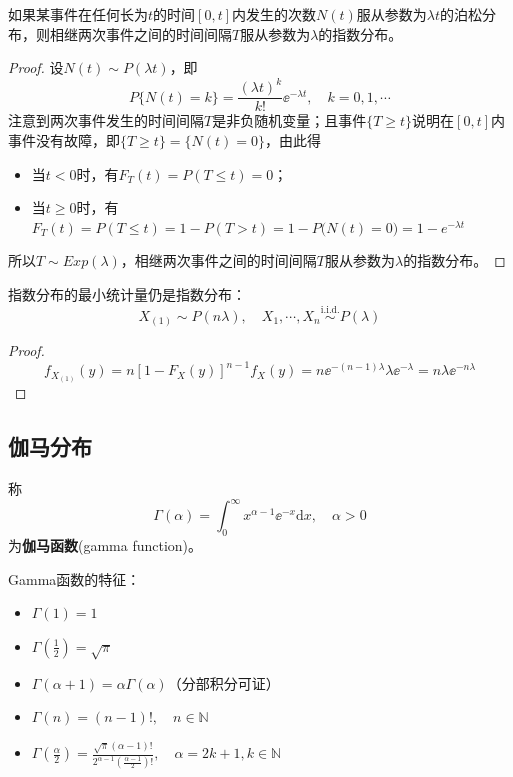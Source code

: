 \begin{proposition}
    如果某事件在任何长为$t$的时间$[0,t]$内发生的次数$N(t)$服从参数为$\lambda t$的泊松分布，则相继两次事件之间的时间间隔$T$服从参数为$\lambda$的指数分布。
\end{proposition}
\begin{proof}
    设$N(t)\sim P(\lambda t)$，即
    \[ P\{ N(t) = k \} = \frac{(\lambda t)^k}{k!} \ee^{-\lambda t},\quad k=0,1,\cdots \]
    注意到两次事件发生的时间间隔$T$是非负随机变量；且事件$\{T\ge t\}$说明在$[0,t]$内事件没有故障，即$\{T\ge t\}=\{N(t)=0\}$，由此得
    \begin{itemize}
        \item 当$t<0$时，有$F_T(t)=P(T\le t)=0$；
        \item 当$t\ge0$时，有$F_T(t) = P(T\le t) = 1 - P(T>t) = 1 -P\big( N(t)=0 \big) = 1 - e^{-\lambda t}$
    \end{itemize}
    所以$T\sim Exp(\lambda)$，相继两次事件之间的时间间隔$T$服从参数为$\lambda$的指数分布。
\end{proof}

\begin{proposition}
    指数分布的最小统计量仍是指数分布：
    \[ X_{(1)} \sim P(n \lambda) ,\quad X_1,\cdots ,X_n \overset{\text{i.i.d.}}{\sim} P(\lambda) \]
\end{proposition}
\begin{proof}
    \[ f_{X_{(1)}}(y)=n[1-F_X(y)]^{n-1}f_X(y)=n \ee^{-(n-1)\lambda} \lambda \ee^{-\lambda} =n \lambda \ee^{-n\lambda} \]
\end{proof}

\subsection{伽马分布}

\begin{definition}[伽马函数]
    称
    \[ \Gamma(\alpha)=\int_0^{\infty}x^{\alpha-1}\ee^{-x}\mathrm{d}x ,\quad \alpha > 0\]
    为\textbf{伽马函数}(gamma function)。
\end{definition}

Gamma函数的特征：
\begin{itemize}
    \item $\Gamma(1)=1$
    \item $\Gamma(\frac{1}{2})=\sqrt{\pi}$
    \item $\Gamma(\alpha+1)=\alpha \Gamma(\alpha)$（分部积分可证）
    \item $\Gamma(n)=(n-1)!,\quad n \in \mathbb{N}$
    \item $\Gamma(\frac{\alpha}{2})=\frac{\sqrt{\pi}(\alpha-1)!}{2^{\alpha-1}(\frac{\alpha-1}{2})!}, \quad \alpha=2k+1,k \in \mathbb{N}$
\end{itemize}

